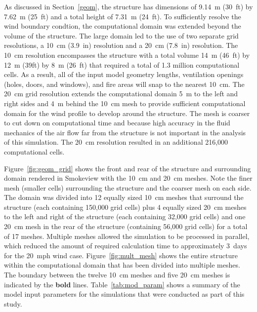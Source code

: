 \documentclass[12pt,oneside]{book}
\begin{document}
As discussed in Section~\ref{geom}, the structure has dimensions of 9.14~m (30~ft) by 7.62~m (25~ft) and a total height of 7.31~m (24~ft). To sufficiently resolve the wind boundary condtion, the computational domain was extended beyond the volume of the structure. The large domain led to the use of two separate grid resolutions, a 10~cm (3.9~in) resolution and a 20~cm (7.8~in) resolution. The 10~cm resolution encompasses the structure with a total volume 14~m (46~ft) by 12~m (39ft) by 8~m (26~ft) that required a total of 1.3 million computational cells. As a result, all of the input model geometry lengths, ventilation openings (holes, doors, and windows), and fire areas will snap to the nearest 10~cm. The 20~cm grid resolution extends the computational domain 5~m to the left and right sides and 4~m behind the 10~cm mesh to provide sufficient computational domain for the wind profile to develop around the structure. The mesh is coarser to cut down on computational time and because high accuracy in the fluid mechanics of the air flow far from the structure is not important in the analysis of this simulation. The 20~cm resolution resulted in an additional 216,000 computational cells.

Figure~\ref{fig:geom_grid} shows the front and rear of the structure and surrounding domain rendered in Smokeview with the 10~cm and 20~cm meshes. Note the finer mesh (smaller cells) surrounding the structure and the coarser mesh on each side. The domain was divided into 12 equally sized 10~cm meshes that surround the structure (each containing 150,000 grid cells) plus 4 equally sized 20~cm meshes to the left and right of the structure (each containing 32,000 grid cells) and one 20~cm mesh in the rear of the structure (containing 56,000 grid cells) for a total of 17 meshes. Multiple meshes allowed the simulation to be processed in parallel, which reduced the amount of required calculation time to approximately 3~days for the 20~mph wind case. Figure~\ref{fig:mult_mesh} shows the entire structure within the computational domain that has been divided into multiple meshes. The boundary between the twelve 10~cm meshes and five 20~cm meshes is indicated by the {\bf bold} lines. Table~\ref{tab:mod_param} shows a summary of the model input parameters for the simulations that were conducted as part of this study.
\end{document}
